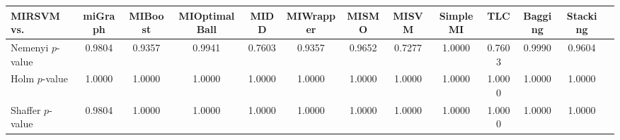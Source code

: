 \begin{threeparttable}
\begin{tabular}{lcccccccccccc}
\toprule
MIRSVM vs. &miGraph &MIBoost &MIOptimalBall &MIDD &MIWrapper &MISMO &MISVM &SimpleMI &TLC &Bagging &Stacking \\
\midrule
Nemenyi $p$-value &0.9804 &0.9357 &0.9941 &0.7603 &0.9357 &0.9652 &0.7277 &1.0000 &0.7603 &0.9990 &0.9604 &  \\
Holm $p$-value &1.0000 &1.0000 &1.0000 &1.0000 &1.0000 &1.0000 &1.0000 &1.0000 &1.0000 &1.0000 &1.0000 &  \\
Shaffer $p$-value &0.9804 &1.0000 &1.0000 &1.0000 &1.0000 &1.0000 &1.0000 &1.0000 &1.0000 &1.0000 &1.0000 &  \\
\bottomrule
\end{tabular}
\end{threeparttable}